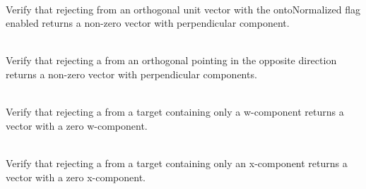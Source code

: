 \begin{DoxyRefList}
\item[{\parbox[t]{\linewidth}{Member \doxylink{group___f_g_m___vec4___rej_gaf41c26cc329f5a4e934f407275771429}{Vector4\+DRejection\+\_\+\+Rejection\+From\+Normalized\+Vector\+Returns\+Non\+Zero\+Vector} ()}}]\hfill \\
\label{test__test000143}%
%
Verify that rejecting from an orthogonal unit vector with the {\ttfamily onto\+Normalized} flag enabled returns a non-\/zero vector with perpendicular component.  
\item[{\parbox[t]{\linewidth}{Member \doxylink{group___f_g_m___vec4___rej_ga1b2ce28c5c44c5f2c9bec888801fa1b9}{Vector4\+DRejection\+\_\+\+Rejection\+From\+Vector\+In\+Opposite\+Direction\+Returns\+Vector\+With\+Perpendicular\+Components} ()}}]\hfill \\
\label{test__test000144}%
%
Verify that rejecting a  from an orthogonal  pointing in the opposite direction returns a non-\/zero vector with perpendicular components.  
\item[{\parbox[t]{\linewidth}{Member \doxylink{group___f_g_m___vec4___rej_gac9e910fa773693082dbc0ebe8845e80f}{Vector4\+DRejection\+\_\+\+Rejection\+From\+WAxis\+Returns\+Vector\+With\+Zero\+WComponent} ()}}]\hfill \\
\label{test__test000139}%
%
Verify that rejecting a  from a target  containing only a w-\/component returns a vector with a zero w-\/component.  
\item[{\parbox[t]{\linewidth}{Member \doxylink{group___f_g_m___vec4___rej_gabd126b5749239148b029535705907c9b}{Vector4\+DRejection\+\_\+\+Rejection\+From\+XAxis\+Returns\+Vector\+With\+Zero\+XComponent} ()}}]\hfill \\
\label{test__test000136}%
%
Verify that rejecting a  from a target  containing only an x-\/component returns a vector with a zero x-\/component.  
\item[{\parbox[t]{\linewidth}{Member \doxylink{group___f_g_m___vec4___rej_gaa4c9eb1430d0d35b655af4a75677823b}{Vector4\+DRejection\+\_\+\+Rejection\+From\+YAxis\+Returns\+Vector\+With\+Zero\+YComponent} ()}}]\hfill \\

\end{DoxyRefList}

